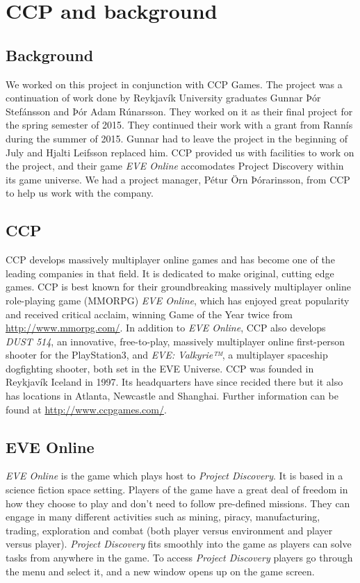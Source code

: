 \section{CCP and background}\label{sec:ccp}

\subsection{Background}

We worked on this project in conjunction with CCP Games. The project was a continuation of work done by Reykjavík University graduates Gunnar Þór Stefánsson and Þór Adam Rúnarsson. They worked on it as their final project for the spring semester of 2015. They continued their work with a grant from Rannís during the summer of 2015. Gunnar had to leave the project in the beginning of July and Hjalti Leifsson replaced him. CCP provided us with facilities to work on the project, and their game \emph{EVE Online} accomodates Project Discovery within its game universe. We had a project manager, Pétur Örn Þórarinsson, from CCP to help us work with the company. 

\subsection{CCP}

CCP develops massively multiplayer online games and has become one of the leading companies in that field. It is dedicated to make original, cutting edge games. CCP is best known for their groundbreaking massively multiplayer online role-playing game (MMORPG) \emph{EVE Online}, which has enjoyed great popularity and received critical acclaim, winning Game of the Year twice from \url{http://www.mmorpg.com/}. In addition to \emph{EVE Online}, CCP also develops \emph{DUST 514\textsuperscript{\textregistered}}, an innovative, free-to-play, massively multiplayer online first-person shooter for the PlayStation\textsuperscript{\textregistered}3, and \emph{EVE: Valkyrie™}, a multiplayer spaceship dogfighting shooter, both set in the EVE Universe. CCP was founded in Reykjavík Iceland in 1997. Its headquarters have since recided there but it also has locations in Atlanta, Newcastle and Shanghai. Further information can be found at \url{http://www.ccpgames.com/}.

\subsection{EVE Online}
\emph{EVE Online} is the game which plays host to \emph{Project Discovery}. It is based in a science fiction space setting. Players of the game have a great deal of freedom in how they choose to play and don't need to follow pre-defined missions. They can engage in many different activities such as mining, piracy, manufacturing, trading, exploration and combat (both player versus environment and player versus player). \emph{Project Discovery} fits smoothly into the game as players can solve tasks from anywhere in the game. To access \emph{Project Discovery} players go through the menu and select it, and a new window opens up on the game screen.